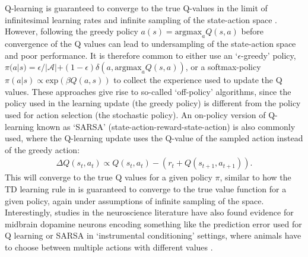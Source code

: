 Q-learning is guaranteed to converge to the true Q-values in the limit of infinitesimal learning rates and infinite sampling of the state-action space \citep{watkins1992q,sutton2018reinforcement}.
However, following the greedy policy $a(s) = \text{argmax}_{a} Q(s, a)$ before convergence of the Q values can lead to undersampling of the state-action space and poor performance.
It is therefore common to either use an `$\epsilon$-greedy' policy, $\pi(a|s) = \epsilon / |\mathcal{A}| + (1-\epsilon) \delta(a, \text{argmax}_{a} Q(s, a))$, or a softmax-policy $\pi(a|s) \propto \text{exp}(\beta Q(a, s))$ to collect the experience used to update the Q values.
These approaches give rise to so-called `off-policy' algorithms, since the policy used in the learning update (the greedy policy) is different from the policy used for action selection (the stochastic policy).
An on-policy version of Q-learning known as `SARSA' (state-action-reward-state-action) is also commonly used, where the Q-learning update uses the Q-value of the sampled action instead of the greedy action:
\begin{align}
    \Delta  Q(s_t,a_t) \propto Q(s_t,a_t) - (r_t + Q(s_{t+1}, a_{t+1})).
\end{align}
This will converge to the true Q values for a given policy $\pi$, similar to how the TD learning rule in  is guaranteed to converge to the true value function for a given policy, again under assumptions of infinite sampling of the space.
Interestingly, studies in the neuroscience literature have also found evidence for midbrain dopamine neurons encoding something like the prediction error used for Q learning \citep{roesch2007dopamine} or SARSA \citep{morris2006midbrain} in `instrumental conditioning' settings, where animals have to choose between multiple actions with different values \citep{niv2009reinforcement}.

